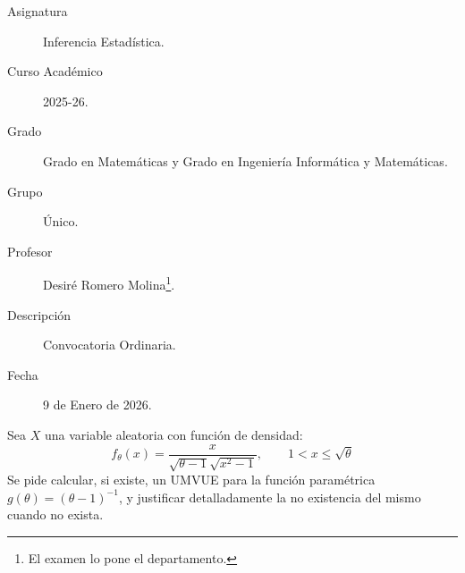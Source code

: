 \documentclass[12pt]{article}
\begin{document}

    
    

    \begin{description}
        \item[Asignatura] Inferencia Estadística.
        \item[Curso Académico] 2025-26.
        \item[Grado] Grado en Matemáticas y Grado en Ingeniería Informática y Matemáticas.
        \item[Grupo] Único.
        \item[Profesor] Desiré Romero Molina\footnote{El examen lo pone el departamento.}.
        \item[Descripción] Convocatoria Ordinaria.
        \item[Fecha] 9 de Enero de 2026.  
    \end{description}
    \newpage



    \begin{ejercicio}[1.9 puntos]
        Sea $X$ una variable aleatoria con función de densidad:
        \begin{equation*}
            f_\theta(x) = \frac{x}{\sqrt{\theta-1}\sqrt{x^2-1}}, \qquad 1<x\leq \sqrt{\theta}
        \end{equation*}
        Se pide calcular, si existe, un UMVUE para la función paramétrica $g(\theta) = {(\theta-1)}^{-1}$, y justificar detalladamente la no existencia del mismo cuando no exista.
    \end{ejercicio}
\end{document}
